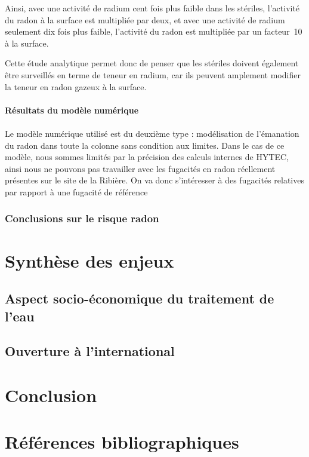 \documentclass{article}
\begin{document}
Ainsi, avec une activité de radium cent fois plus faible dans les stériles, l'activité du radon à la surface est multipliée par deux, et avec une activité de radium seulement dix fois plus faible, l'activité du radon est multipliée par un facteur~10 à la surface.

Cette étude analytique permet donc de penser que les stériles doivent également être surveillés en terme de teneur en radium, car ils peuvent amplement modifier la teneur en radon gazeux à la surface.

\paragraph{Résultats du modèle numérique}
\paragraph{} Le modèle numérique utilisé est du deuxième type : modélisation de l'émanation du radon dans toute la colonne sans condition aux limites. Dans le cas de ce modèle, nous sommes limités par la précision des calculs internes de HYTEC, ainsi nous ne pouvons pas travailler avec les fugacités en radon réellement présentes sur le site de la Ribière. On va donc s'intéresser à des fugacités relatives par rapport à une fugacité de référence

\subsubsection{Conclusions sur le risque radon}

\newpage
\section{Synthèse des enjeux}
\subsection{Aspect socio-économique du traitement de l’eau}
\subsection{Ouverture à l’international}

\newpage
\section*{Conclusion}

\newpage
\section*{Références bibliographiques}
\end{document}
